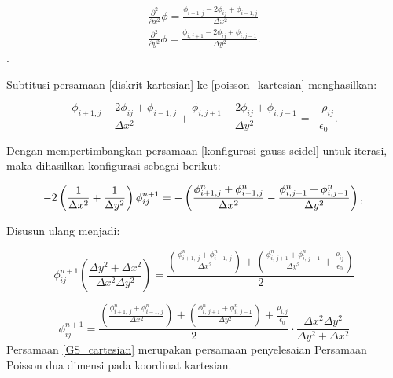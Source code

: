 \begin{equation}\label{diskrit kartesian}
    \begin{split}
        \frac{\partial^2}{\partial x^2} \phi=\frac{\phi_{i+1,j}-2 \phi_{ij}+\phi_{i-1, j}}{\Delta x^2}\\
        \frac{\partial^2}{\partial y^2} \phi = \frac{\phi_{i,j+1}-2 \phi_{ij}+\phi_{i, j-1}}{\Delta y^2}.
    \end{split}
\end{equation}.

Subtitusi persamaan \eqref{diskrit kartesian} ke \eqref{poisson_kartesian} menghasilkan:

\begin{equation}
    \frac{\phi_{i+1,j}-2 \phi_{ij}+\phi_{i-1, j}}{\Delta x^2}+\frac{\phi_{i,j+1}-2 \phi_{ij}+\phi_{i, j-1}}{\Delta y^2} = \frac{-\rho_{ij}}{\epsilon_{0}}.
\end{equation}

Dengan mempertimbangkan persamaan \eqref{konfigurasi gauss seidel} untuk iterasi, maka dihasilkan konfigurasi sebagai berikut:

\begin{equation}
    -2\left(\frac{1}{\Delta x^2} + \frac{1}{\Delta y^2}\right) \phi_{ij}^{n+1} = -\left(\frac{\phi^{n}_{i+1,j}+\phi^{n}_{i-1,j}}{\Delta x^2}-\frac{\phi^{n}_{i,j+1}+\phi^{n}_{i,j-1}}{\Delta y^2}\right),\\
\end{equation}

Disusun ulang menjadi:

\begin{equation}
    \phi^{n+1}_{ij} \left(\frac{\Delta y^2 + \Delta x^2}{\Delta x^2 \Delta y^2} \right) = \frac{\left(\frac{\phi^{n}_{i+1,\ j}+\phi^{n}_{i-1,\ j}}{\Delta x^2}\right)+\left(\frac{\phi^{n}_{i,\ j+1}+\phi^{n}_{i,\ j-1}}{\Delta y^2}+\frac{\rho_{ij}}{\epsilon_0}\right)}{2}
\end{equation}

\begin{equation}\label{GS_cartesian}
    \phi_{ij}^{n+1}=\frac{\left(\frac{\phi^n_{i+1,\ j}+\phi^n_{i-1,\ j}}{\Delta x^2}\right)+\left(\frac{\phi^n_{i,\ j+1}+\phi^n_{i,\ j-1}}{\Delta y^2}\right)+\frac{\rho_{i,j}}{\epsilon_0}}{2} \cdot \frac{\Delta x^2 \Delta y^2}{\Delta y^2 + \Delta x^2}
\end{equation}
Persamaan \eqref{GS_cartesian} merupakan persamaan penyelesaian Persamaan Poisson dua dimensi pada koordinat kartesian. 

